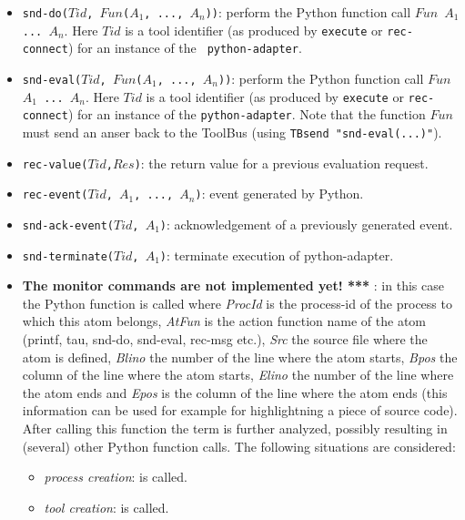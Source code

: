 \begin{itemize}
\item {\tt snd-do($Tid$, $Fun$($A_1$, ..., $A_n$))}: perform the Python function call
{\tt $Fun$ $A_1$  ... $A_n$}. Here $Tid$ is a tool identifier
(as produced by {\tt execute} or {\tt rec-connect}) for an instance of the {\tt
python-adapter}.
\item {\tt snd-eval($Tid$, $Fun$($A_1$, ..., $A_n$))}: perform the Python function call
{\tt $Fun$ $A_1$  ... $A_n$}. Here $Tid$ is a tool identifier 
(as produced by {\tt execute} or {\tt rec-connect}) for an instance of the {\tt python-adapter}.
Note that the function {\tt $Fun$} must send an anser back to the
ToolBus (using {\tt TBsend "snd-eval(...)"}).
\item {\tt rec-value($Tid$,$Res$)}: the return value for a previous evaluation request.
\item {\tt rec-event($Tid$, $A_1$, ..., $A_n$)}: event generated by Python.
\item {\tt snd-ack-event($Tid$, $A_1$)}: acknowledgement of
a previously generated event.
\item {\tt snd-terminate($Tid$, $A_1$)}: terminate execution of python-adapter.
\item {\bf The monitor commands are not implemented yet! ***}
	: in this case the Python
  function 
  is called where \emph{ProcId} is the process-id of the process to
  which this atom belongs, \emph{AtFun} is the action function name of
  the atom (printf, tau, snd-do, snd-eval, rec-msg etc.), \emph{Src} the
  source file where the atom is defined, \emph{Blino} the number of
  the line where the atom starts, \emph{Bpos} the column of the
  line where the atom starts, \emph{Elino} the number of the line
  where the atom ends and \emph{Epos} is the column of the line where
  the atom ends (this information can be used for example for
  highlightning a piece of source code). 
  After calling this function the term is further analyzed,
  possibly resulting in (several) other Python function
  calls. The following situations are considered:
  \begin{itemize}
  \item \emph{process creation}:
     is
    called.
  \item \emph{tool creation}:  is called.

\end{itemize}
\end{itemize}
